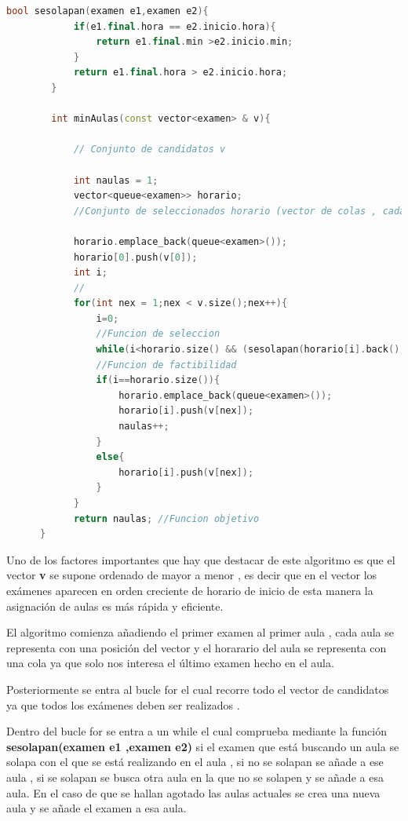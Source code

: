 \documentclass[11pt,openany]{book}
\begin{document}
\begin{lstlisting}[language=C++]
      bool sesolapan(examen e1,examen e2){
            if(e1.final.hora == e2.inicio.hora){
                return e1.final.min >e2.inicio.min;
            }
            return e1.final.hora > e2.inicio.hora;
        }
        
        int minAulas(const vector<examen> & v){
        
            // Conjunto de candidatos v
        
            int naulas = 1;
            vector<queue<examen>> horario;
            //Conjunto de seleccionados horario (vector de colas , cada cola es un aula)
            
            horario.emplace_back(queue<examen>());
            horario[0].push(v[0]);
            int i;
            //
            for(int nex = 1;nex < v.size();nex++){
                i=0;
                //Funcion de seleccion
                while(i<horario.size() && (sesolapan(horario[i].back(),v[nex]))){i++;}
                //Funcion de factibilidad
                if(i==horario.size()){
                    horario.emplace_back(queue<examen>());
                    horario[i].push(v[nex]);
                    naulas++;
                }
                else{
                    horario[i].push(v[nex]);
                }
            }
            return naulas; //Funcion objetivo 
      }
\end{lstlisting}

Uno de los factores importantes que hay que destacar de este algoritmo es que el vector \textbf{v} se supone 
ordenado de mayor a menor , es decir que en el vector los exámenes aparecen en orden creciente de 
horario de inicio de esta manera la asignación de aulas es más rápida y eficiente.

El algoritmo comienza añadiendo el primer examen al primer aula , cada aula se representa con una posición del vector 
y el horarario del aula se representa con una cola ya que solo nos interesa el último examen hecho en el aula.

Posteriormente se entra al bucle for el cual recorre todo el vector de candidatos ya que todos los exámenes deben
ser realizados . 

Dentro del bucle for se entra a un while el cual comprueba mediante la función \textbf{sesolapan(examen e1 ,examen e2)}
si el examen que está buscando un aula se solapa con el que se está realizando en el aula , si no se solapan se añade a 
ese aula , si se solapan se busca otra aula en la que no se solapen y se añade a esa aula. En el caso de que se hallan agotado
las aulas actuales se crea una nueva aula y se añade el examen a esa aula.
\end{document}

